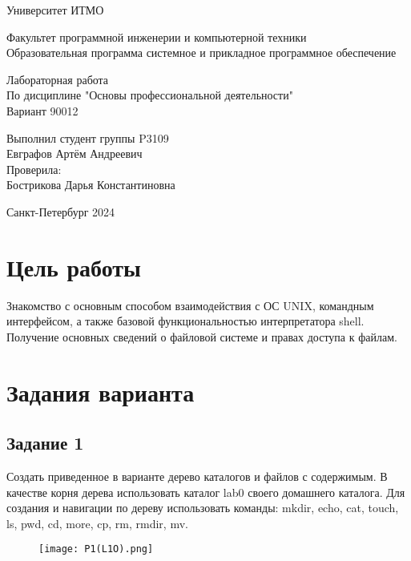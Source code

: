 

\thispagestyle{empty}
\begin{center}
\LARGE{Университет ИТМО} 
\vspace{20pt}

\LARGE{Факультет программной инженерии и компьютерной техники \\
Образовательная программа системное и прикладное программное обеспечение}
\vspace{160pt}

\LARGE{Лабораторная работа   \\
По дисциплине "Основы профессиональной деятельности" \\ 
Вариант 90012}
\vspace{120pt}
\end{center}

\begin{flushright}
\LARGE{Выполнил студент группы P3109 \\ 
Евграфов Артём Андреевич \\
Проверила: \\
Бострикова Дарья Константиновна}
\vspace{120pt}
\end{flushright}

\begin{center}
\Large{Санкт-Петербург 2024}
\end{center}

\newpage
\setcounter{page}{1}
\section*{Цель работы}
Знакомство с основным способом взаимодействия с ОС UNIX, командным интерфейсом, а также базовой функциональностью интерпретатора shell. Получение основных сведений о файловой системе и правах доступа к файлам.
\section*{Задания варианта}
\subsection*{Задание 1}
Создать приведенное в варианте дерево каталогов и файлов с содержимым. В качестве корня дерева использовать каталог lab0 своего домашнего каталога. Для создания и навигации по дереву использовать команды: mkdir, echo, cat, touch, ls, pwd, cd, more, cp, rm, rmdir, mv.
\begin{figure}[H]
    \centering
    \texttt{[image: P1(L1O).png]}
    \label{fig:enter-label}
\end{figure}
